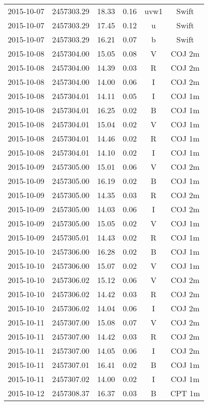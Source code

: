 \begin{table}
\begin{tabular}{cccccc}
2015-10-07 & 2457303.29 & 18.33 & 0.16 & uvw1 & Swift \\
2015-10-07 & 2457303.29 & 17.45 & 0.12 & u & Swift \\
2015-10-07 & 2457303.29 & 16.21 & 0.07 & b & Swift \\
2015-10-08 & 2457304.00 & 15.05 & 0.08 & V & COJ 2m \\
2015-10-08 & 2457304.00 & 14.39 & 0.03 & R & COJ 2m \\
2015-10-08 & 2457304.00 & 14.00 & 0.06 & I & COJ 2m \\
2015-10-08 & 2457304.01 & 14.11 & 0.05 & I & COJ 1m \\
2015-10-08 & 2457304.01 & 16.25 & 0.02 & B & COJ 1m \\
2015-10-08 & 2457304.01 & 15.04 & 0.02 & V & COJ 1m \\
2015-10-08 & 2457304.01 & 14.46 & 0.02 & R & COJ 1m \\
2015-10-08 & 2457304.01 & 14.10 & 0.02 & I & COJ 1m \\
2015-10-09 & 2457305.00 & 15.01 & 0.06 & V & COJ 2m \\
2015-10-09 & 2457305.00 & 16.19 & 0.02 & B & COJ 1m \\
2015-10-09 & 2457305.00 & 14.35 & 0.03 & R & COJ 2m \\
2015-10-09 & 2457305.00 & 14.03 & 0.06 & I & COJ 2m \\
2015-10-09 & 2457305.00 & 15.05 & 0.02 & V & COJ 1m \\
2015-10-09 & 2457305.01 & 14.43 & 0.02 & R & COJ 1m \\
2015-10-10 & 2457306.00 & 16.28 & 0.02 & B & COJ 1m \\
2015-10-10 & 2457306.00 & 15.07 & 0.02 & V & COJ 1m \\
2015-10-10 & 2457306.02 & 15.12 & 0.06 & V & COJ 2m \\
2015-10-10 & 2457306.02 & 14.42 & 0.03 & R & COJ 2m \\
2015-10-10 & 2457306.02 & 14.04 & 0.06 & I & COJ 2m \\
2015-10-11 & 2457307.00 & 15.08 & 0.07 & V & COJ 2m \\
2015-10-11 & 2457307.00 & 14.42 & 0.03 & R & COJ 2m \\
2015-10-11 & 2457307.00 & 14.05 & 0.06 & I & COJ 2m \\
2015-10-11 & 2457307.01 & 16.41 & 0.02 & B & COJ 1m \\
2015-10-11 & 2457307.02 & 14.00 & 0.02 & I & COJ 1m \\
2015-10-12 & 2457308.37 & 16.37 & 0.03 & B & CPT 1m \\

\end{tabular}
\end{table}
